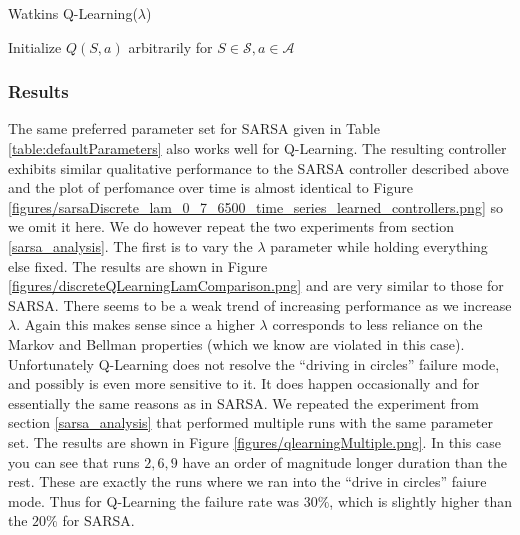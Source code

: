 \documentclass{article}
\begin{document}
\begin{algorithm}[H]
   \caption{Watkins Q-Learning($\lambda$)}
   \label{alg:Q-Learning}
\begin{algorithmic}
   \STATE Initialize $Q(S,a)$ arbitrarily for $S \in \mathcal{S}, a \in \mathcal{A}$
   \REPEAT

\end{algorithmic}
\end{algorithm}


\subsubsection{Results}

The same preferred parameter set for SARSA given in Table \ref{table:defaultParameters} also works well for Q-Learning. The resulting controller exhibits similar qualitative performance to the SARSA controller described above and the plot of perfomance over time is almost identical to Figure \ref{figures/sarsaDiscrete_lam_0_7_6500_time_series_learned_controllers.png} so we omit it here. We do however repeat the two experiments from section \ref{sarsa_analysis}. The first is to vary the $\lambda$ parameter while holding everything else fixed. The results are shown in Figure \ref{figures/discreteQLearningLamComparison.png} and are very similar to those for SARSA. There seems to be a weak trend of increasing performance as we increase $\lambda$. Again this makes sense since a higher $\lambda$ corresponds to less reliance on the Markov and Bellman properties (which we know are violated in this case). Unfortunately Q-Learning does not resolve the ``driving in circles'' failure mode, and possibly is even more sensitive to it. It does happen occasionally and for essentially the same reasons as in SARSA. We repeated the experiment from section \ref{sarsa_analysis} that performed multiple runs with the same parameter set. The results are shown in Figure \ref{figures/qlearningMultiple.png}. In this case you can see that runs $2,6,9$ have an order of magnitude longer duration than the rest. These are exactly the runs where we ran into the ``drive in circles'' faiure mode. Thus for Q-Learning the failure rate was $30\%$, which is slightly higher than the $20\%$ for SARSA.
\end{document}

